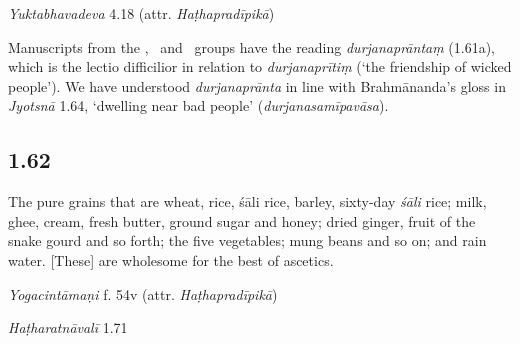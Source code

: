 \begin{ekdosis}
\begin{testimonia}[hp01_061]
\emph{Yuktabhavadeva} 4.18 (attr. \emph{Haṭhapradīpikā})
\begin{versinnote}
\end{versinnote}

\end{testimonia}

\begin{philcomm}[hp01_061]
Manuscripts from the \textalpha, \textbeta\ and \textepsilon\ groups have the reading \emph{durjanaprāntaṃ} (1.61a), which is the lectio difficilior in relation to \emph{durjanaprītiṃ} (`the friendship of wicked people'). We have understood \emph{durjanaprānta} in line with Brahmānanda's gloss in \emph{Jyotsnā} 1.64, `dwelling near bad people' (\emph{durjanasamīpavāsa}).  
\end{philcomm}

\subsection*{1.62}
\begin{translation}[hp01_062]
The pure grains that are wheat, rice, śāli rice, barley, sixty-day \emph{śāli} rice; milk, ghee, cream, fresh butter, ground sugar and honey; dried ginger, fruit of the snake gourd and so forth; the five vegetables; mung beans and so on; and rain water. [These] are wholesome for the best of ascetics.%
\end{translation}


\begin{testimonia}[hp01_062]
\emph{Yogacintāmaṇi} f. 54v (attr. \emph{Haṭhapradīpikā})

\begin{versinnote}
\end{versinnote}

\emph{Haṭharatnāvalī} 1.71

\begin{versinnote}
\tl{\var{°phalapatraja° ] phalādika N,n1,J. yamīndra° ] yatīndra° N,n1,J}\\!}
\end{versinnote}


\end{testimonia}
\end{ekdosis}
